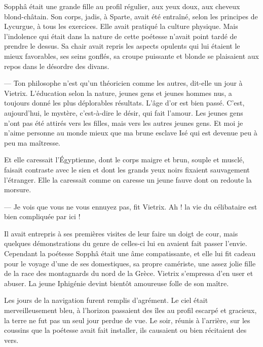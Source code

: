 \documentclass[a4paper, 11pt, oneside, polutonikogreek, french]{article}
\begin{document}
\bigskip
\centerline{\EightStarTaper}
\centerline{\EightStarTaper\EightStarTaper}
\bigskip

Sopphâ était une grande fille au profil régulier, aux yeux doux, aux cheveux blond-châtain. Son corps, jadis, à Sparte, avait été entraîné, selon les principes de Lycurgue, à tous les exercices. Elle avait pratiqué la culture physique. Mais l'indolence qui était dans la nature de cette poétesse n'avait point tardé de prendre le dessus. Sa chair avait repris les aspects opulents qui lui étaient le mieux favorables, ses seins gonflés, sa croupe puissante et blonde se plaisaient aux repos dans le désordre des divans.

--- Ton philosophe n'est qu'un théoricien comme les autres, dit-elle un jour à Vietrix. L'éducation selon la nature, jeunes gens et jeunes hommes nus, a toujours donné les plus déplorables résultats. L'âge d'or est bien passé. C'est, aujourd'hui, le mystère, c'est-à-dire le désir, qui fait l'amour. Les jeunes gens n'ont pas été attirés vers les filles, mais vers les autres jeunes gens. Et moi je n'aime personne au monde mieux que ma brune esclave Isé qui est devenue peu à peu ma maîtresse.

Et elle caressait l'Égyptienne, dont le corps maigre et brun, souple et musclé, faisait contraste avec le sien et dont les grands yeux noirs fixaient sauvagement l'étranger. Elle la caressait comme on caresse un jeune fauve dont on redoute la morsure.

--- Je vois que vous ne vous ennuyez pas, fit Vietrix. Ah ! la vie du célibataire est bien compliquée par ici !

Il avait entrepris à ses premières visites de leur faire un doigt de cour, mais quelques démonstrations du genre de celles-ci lui en avaient fait passer l'envie. Cependant la poétesse Sopphâ était une âme compatissante, et elle lui fit cadeau pour le voyage d'une de ses domestiques, sa propre camériste, une assez jolie fille de la race des montagnards du nord de la Grèce. Vietrix s'empressa d'en user et abuser. La jeune Iphigénie devint bientôt amoureuse folle de son maître.

\bigskip
\centerline{\EightStarTaper}
\centerline{\EightStarTaper\EightStarTaper}
\bigskip

Les jours de la navigation furent remplis d'agrément. Le ciel était merveilleusement bleu, à l'horizon passaient des îles au profil escarpé et gracieux, la terre ne fut pas un seul jour perdue de vue. Le soir, réunis à l'arrière, sur les coussins que la poétesse avait fait installer, ils causaient ou bien récitaient des vers.
\end{document}
